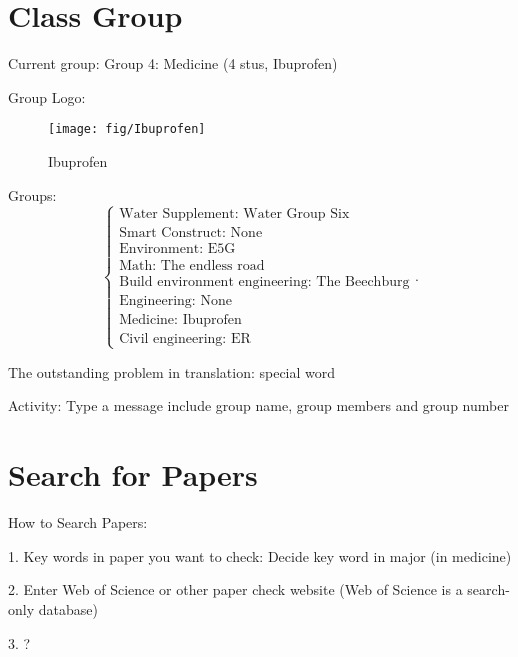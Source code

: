 \section{Class Group}%
\label{sec:Class Group}
Current group: Group 4: Medicine (4 stus, Ibuprofen)

Group Logo:
\begin{figure}[htpb]
    \centering
    \texttt{[image: fig/Ibuprofen]}
    \caption{Ibuprofen}
    \label{fig:Ibuprofen}
\end{figure}

Groups:
\[
    \begin{cases}
        \text{Water Supplement: Water Group Six}\\
        \text{Smart Construct: None}\\
        \text{Environment: E5G}\\
        \text{Math: The endless road}\\
        \text{Build environment engineering: The Beechburg}\\
        \text{Engineering: None}\\
        \text{Medicine: Ibuprofen}\\
        \text{Civil engineering: ER}
    \end{cases}
.\] 

The outstanding problem in translation: special word

Activity: Type a message include group name, group members and group number

\section{Search for Papers}%
\label{sec:Search for Papers}
How to Search Papers:

1. Key words in paper you want to check: Decide key word in major (in medicine)

2. Enter Web of Science or other paper check website (Web of Science is a search-only database)

3. ? 

